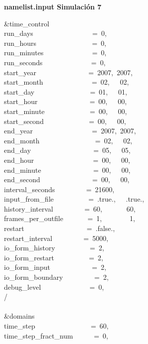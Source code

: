 
\textbf{namelist.input Simulación 7}

\&time\_control~~~~~~~~~~~~\\
run\_days~~~~~~~~~~~~~~~~~=~0,\\
run\_hours~~~~~~~~~~~~~~~~=~0,\\
run\_minutes~~~~~~~~~~~~~~=~0,\\
run\_seconds~~~~~~~~~~~~~~=~0,\\
start\_year~~~~~~~~~~~~~~~=~2007,~2007,~\\
start\_month~~~~~~~~~~~~~~=~02,~~~02,~~~\\
start\_day~~~~~~~~~~~~~~~~=~01,~~~01,~~~\\
start\_hour~~~~~~~~~~~~~~~=~00,~~~00,~~~\\
start\_minute~~~~~~~~~~~~~=~00,~~~00,~~~\\
start\_second~~~~~~~~~~~~~=~00,~~~00,~~~\\
end\_year~~~~~~~~~~~~~~~~~=~2007,~2007,~\\
end\_month~~~~~~~~~~~~~~~~=~02,~~~02,~~~\\
end\_day~~~~~~~~~~~~~~~~~~=~05,~~~05,~~~\\
end\_hour~~~~~~~~~~~~~~~~~=~00,~~~00,~~~\\
end\_minute~~~~~~~~~~~~~~~=~00,~~~00,~~~\\
end\_second~~~~~~~~~~~~~~~=~00,~~~00,~~~\\
interval\_seconds~~~~~~~~~=~21600,\\
input\_from\_file~~~~~~~~~~=~.true.,~~~.true.,~\\
history\_interval~~~~~~~~~=~60,~~~~~~~60,~~~~~\\
frames\_per\_outfile~~~~~~~=~1,~~~~~~~~1,~~~~~~\\
restart~~~~~~~~~~~~~~~~~~=~.false.,\\
restart\_interval~~~~~~~~~=~5000,\\
io\_form\_history~~~~~~~~~~=~2,\\
io\_form\_restart~~~~~~~~~~=~2,\\
io\_form\_input~~~~~~~~~~~~=~2,\\
io\_form\_boundary~~~~~~~~~=~2,\\
debug\_level~~~~~~~~~~~~~~=~0,\\
/\\
\\
\&domains~~~~~~~~~~~~~~~~~\\
time\_step~~~~~~~~~~~~~~~~=~60,\\
time\_step\_fract\_num~~~~~~=~0,\\
